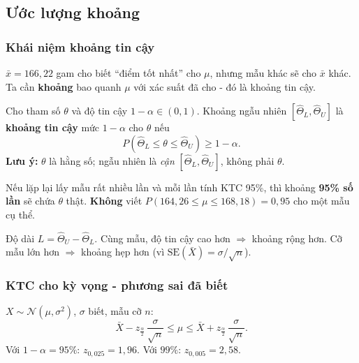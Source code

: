\documentclass[12pt,a4paper]{article}
\begin{document}
\subsection{Ước lượng khoảng}

\subsubsection{Khái niệm khoảng tin cậy}

\begin{dongco}[title={Động cơ - Điểm ước lượng chưa đủ}]
$\bar{x} = 166{,}22$ gam cho biết ``điểm tốt nhất'' cho $\mu$, nhưng mẫu khác sẽ cho $\bar{x}$ khác. Ta cần \textbf{khoảng} bao quanh $\mu$ với xác suất đã cho - đó là khoảng tin cậy.
\end{dongco}

\begin{dinhnghia}[title={Khoảng tin cậy (KTC)}]
  Cho tham số $\theta$ và độ tin cậy $1-\alpha \in (0,1)$. Khoảng ngẫu nhiên $[\hat{\Theta}_L, \hat{\Theta}_U]$ là \textbf{khoảng tin cậy} mức $1-\alpha$ cho $\theta$ nếu
  \[
    P(\hat{\Theta}_L \le \theta \le \hat{\Theta}_U) \ge 1 - \alpha.
  \]
  \textbf{Lưu ý:} $\theta$ là hằng số; ngẫu nhiên là \emph{cận} $[\hat{\Theta}_L, \hat{\Theta}_U]$, không phải $\theta$.
\end{dinhnghia}

\begin{luuy}[title={Diễn giải đúng độ tin cậy 95\%}]
Nếu lặp lại lấy mẫu rất nhiều lần và mỗi lần tính KTC 95\%, thì khoảng \textbf{95\% số lần} sẽ chứa $\theta$ thật. \textbf{Không} viết $P(164{,}26 \le \mu \le 168{,}18) = 0{,}95$ cho một mẫu cụ thể.
\end{luuy}

\begin{ynghia}[title={Độ dài khoảng tin cậy}]
Độ dài $L = \hat{\Theta}_U - \hat{\Theta}_L$. Cùng mẫu, độ tin cậy cao hơn $\Rightarrow$ khoảng rộng hơn. Cỡ mẫu lớn hơn $\Rightarrow$ khoảng hẹp hơn (vì $\text{SE}(\bar{X}) = \sigma/\sqrt{n}$).
\end{ynghia}

\subsubsection{KTC cho kỳ vọng - phương sai đã biết}

\begin{congthuc}[title={KTC đối xứng cho $\mu$ khi $\sigma$ biết}]
  $X \sim \mathcal{N}(\mu,\sigma^2)$, $\sigma$ biết, mẫu cỡ $n$:
  \[
    \bar{X} - z_{\frac{\alpha}{2}}\,\dfrac{\sigma}{\sqrt{n}} \le \mu \le \bar{X} + z_{\frac{\alpha}{2}}\,\dfrac{\sigma}{\sqrt{n}}.
  \]
  Với $1-\alpha = 95\%$: $z_{0{,}025} = 1{,}96$. Với $99\%$: $z_{0{,}005} = 2{,}58$.
\end{congthuc}
\end{document}
